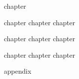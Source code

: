 \documentclass[a4paper,10pt,twoside]{MFHbook}
\begin{document}









\newpage
{}
     {chapter}

        {chapter}
   {chapter}
     {chapter}

{chapter}
{chapter}
  {chapter}

  {chapter}
{chapter}
   {chapter}


 {appendix}





\end{document}
